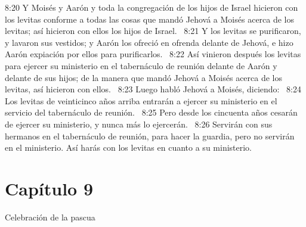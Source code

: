 8:20 Y Moisés y Aarón y toda la congregación de los hijos de Israel hicieron con los levitas conforme a todas las cosas que mandó Jehová a Moisés acerca de los levitas; así hicieron con ellos los hijos de Israel.  
8:21 Y los levitas se purificaron, y lavaron sus vestidos; y Aarón los ofreció en ofrenda delante de Jehová, e hizo Aarón expiación por ellos para purificarlos.  
8:22 Así vinieron después los levitas para ejercer su ministerio en el tabernáculo de reunión delante de Aarón y delante de sus hijos; de la manera que mandó Jehová a Moisés acerca de los levitas, así hicieron con ellos.  
8:23 Luego habló Jehová a Moisés, diciendo:  
8:24 Los levitas de veinticinco años arriba entrarán a ejercer su ministerio en el servicio del tabernáculo de reunión.  
8:25 Pero desde los cincuenta años cesarán de ejercer su ministerio, y nunca más lo ejercerán.  
8:26 Servirán con sus hermanos en el tabernáculo de reunión, para hacer la guardia, pero no servirán en el ministerio. Así harás con los levitas en cuanto a su ministerio.  
\section*{Capítulo 9}
Celebración de la pascua  

